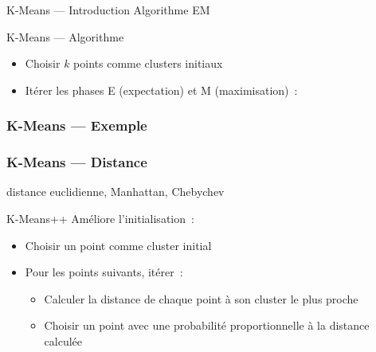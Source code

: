 \begin{frame}{K-Means --- Introduction}
  Algorithme EM
\end{frame}

\begin{frame}{K-Means --- Algorithme}
  \begin{itemize}[<+->]
    \item Choisir $k$ points comme clusters initiaux
    \item Itérer les phases E (expectation) et M (maximisation)~:
  \end{itemize}  
\end{frame}

\begin{frame}
  \frametitle{K-Means --- Exemple}
\end{frame}

\begin{frame}
  \frametitle{K-Means --- Distance}
  distance euclidienne, Manhattan, Chebychev
\end{frame}

\begin{frame}{K-Means++}
  Améliore l'initialisation~:

  \begin{itemize}[<+->]
    \item Choisir un point comme cluster initial
    \item Pour les points suivants, itérer~:
      \begin{itemize}[<+->]
        \item Calculer la distance de chaque point à son cluster le plus proche
        \item Choisir un point avec une probabilité proportionnelle à la distance calculée
      \end{itemize}
  \end{itemize}

\end{frame}

